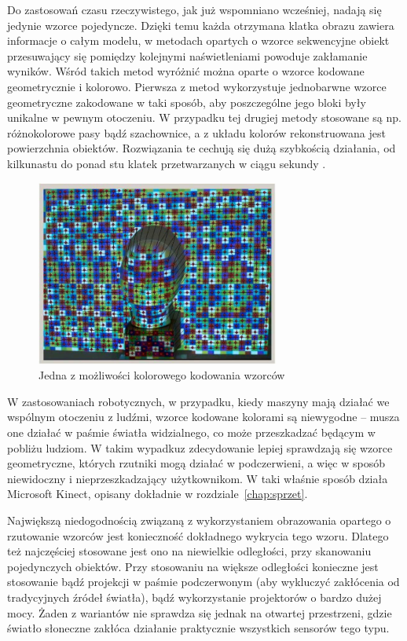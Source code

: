 Do zastosowań czasu rzeczywistego, jak już wspomniano wcześniej, nadają się
jedynie wzorce pojedyncze. Dzięki temu każda otrzymana klatka obrazu zawiera
informacje o całym modelu, w metodach opartych o wzorce sekwencyjne obiekt
przesuwający się pomiędzy kolejnymi naświetleniami powoduje zakłamanie wyników. 
Wśród takich metod wyróżnić można oparte o wzorce kodowane geometrycznie i
kolorowo. Pierwsza z metod wykorzystuje jednobarwne wzorce geometryczne
zakodowane w taki sposób, aby poszczególne jego bloki były unikalne w pewnym
otoczeniu. W przypadku tej drugiej metody stosowane są np. różnokolorowe pasy
bądź szachownice, a z układu kolorów rekonstruowana jest powierzchnia obiektów.
Rozwiązania te cechują się dużą szybkością działania, od kilkunastu do ponad
stu klatek przetwarzanych w ciągu sekundy \cite{4429304}.

\begin{figure}[h!]
\centering
\includegraphics[width=8cm]{../../Common/img/struct_color} 
\caption[Wzorzec kodowany kolorem]
{Jedna z możliwości kolorowego kodowania wzorców \cite{4429304}}
\label{fig:struct_color}
\end{figure}

W zastosowaniach robotycznych, w przypadku, kiedy maszyny mają działać we
wspólnym otoczeniu z ludźmi, wzorce kodowane kolorami są niewygodne -- musza one
działać w paśmie światła widzialnego, co może przeszkadzać będącym w pobliżu
ludziom. W takim wypadkuz zdecydowanie lepiej sprawdzają się wzorce
geometryczne, których rzutniki mogą działać w podczerwieni, a więc w sposób
niewidoczny i nieprzeszkadzający użytkownikom. W taki właśnie sposób działa
Microsoft Kinect, opisany dokładnie w rozdziale~\ref{chap:sprzet}.  

Największą niedogodnością związaną z wykorzystaniem obrazowania opartego o
rzutowanie wzorców jest konieczność dokładnego wykrycia tego wzoru. Dlatego też
najczęściej stosowane jest ono na niewielkie odległości, przy skanowaniu
pojedynczych obiektów. Przy stosowaniu na większe odległości konieczne jest
stosowanie bądź projekcji w paśmie podczerwonym (aby wykluczyć zakłócenia od
tradycyjnych źródeł światła), bądź wykorzystanie projektorów o bardzo dużej
mocy. Żaden z wariantów nie sprawdza się jednak na otwartej przestrzeni, gdzie
światło słoneczne zakłóca działanie praktycznie wszystkich sensorów tego typu.

